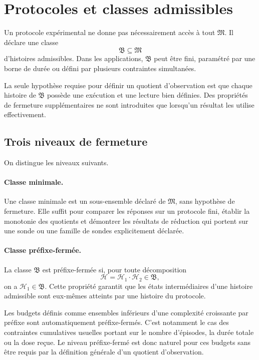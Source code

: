 \section{Protocoles et classes admissibles}
\label{annexe-histoires-admissibilite}

Un protocole expérimental ne donne pas nécessairement accès à tout
\(\mathfrak M\). Il déclare une classe
\[
\mathfrak B\subseteq\mathfrak M
\]
d'histoires admissibles. Dans les applications, \(\mathfrak B\) peut
être fini, paramétré par une borne de durée ou défini par plusieurs
contraintes simultanées.

La seule hypothèse requise pour définir un quotient d'observation est
que chaque histoire de \(\mathfrak B\) possède une exécution et une
lecture bien définies. Des propriétés de fermeture supplémentaires ne
sont introduites que lorsqu'un résultat les utilise effectivement.

\subsection{Trois niveaux de fermeture}
\label{annexe-histoires-fermetures}

On distingue les niveaux suivants.

\paragraph{Classe minimale.}
Une classe minimale est un sous-ensemble déclaré de \(\mathfrak M\),
sans hypothèse de fermeture. Elle suffit pour comparer les réponses sur
un protocole fini, établir la monotonie des quotients et démontrer les
résultats de réduction qui portent sur une sonde ou une famille de
sondes explicitement déclarée.

\paragraph{Classe préfixe-fermée.}
La classe \(\mathfrak B\) est préfixe-fermée si, pour toute
décomposition
\[
\mathcal H=\mathcal H_1\cdot\mathcal H_2\in\mathfrak B,
\]
on a \(\mathcal H_1\in\mathfrak B\). Cette propriété garantit que les
états intermédiaires d'une histoire admissible sont eux-mêmes atteints
par une histoire du protocole.

Les budgets définis comme ensembles inférieurs d'une complexité croissante par préfixe sont automatiquement préfixe-fermés. C'est notamment le cas des contraintes cumulatives usuelles portant sur le nombre d'épisodes, la durée totale ou la dose reçue. Le niveau préfixe-fermé est donc naturel pour ces budgets sans être requis par la définition générale d'un quotient d'observation.

